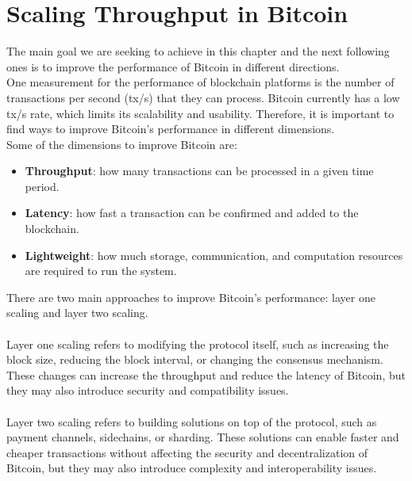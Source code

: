 \chapter{Scaling Throughput in Bitcoin}
The main goal we are seeking to achieve in this chapter and the next following ones is to improve the performance of Bitcoin in different directions. \\
One measurement for the performance of blockchain platforms is the number of transactions per second (tx/s) that they can process. Bitcoin currently has a low tx/s rate, which limits its scalability and usability. Therefore, it is important to find ways to improve Bitcoin’s performance in different dimensions.\\
Some of the dimensions to improve Bitcoin are:
\begin{itemize}
	\item \textbf{Throughput}: how many transactions can be processed in a given time period.
	\item \textbf{Latency}: how fast a transaction can be confirmed and added to the blockchain.
	\item \textbf{Lightweight}: how much storage, communication, and computation resources are required to run the system.
\end{itemize}
There are two main approaches to improve Bitcoin’s performance: layer one scaling and layer two scaling.\\\\
Layer one scaling refers to modifying the protocol itself, such as increasing the block size, reducing the block interval, or changing the consensus mechanism. These changes can increase the throughput and reduce the latency of Bitcoin, but they may also introduce security and compatibility issues.\\\\
Layer two scaling refers to building solutions on top of the protocol, such as payment channels, sidechains, or sharding. These solutions can enable faster and cheaper transactions without affecting the security and decentralization of Bitcoin, but they may also introduce complexity and interoperability issues.

